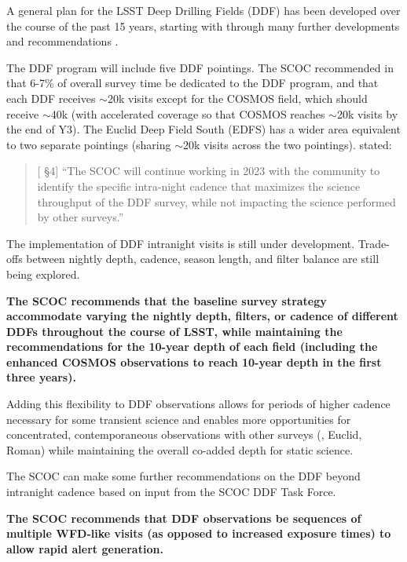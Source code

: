 A general plan for the LSST Deep Drilling Fields (DDF) has been developed over the course of the past 15 years, starting with \cite{2009arXiv0912.0201L} through many further developments and recommendations \citep[\eg ,][]{Brandt:2018,Scolnic:2018,Yu:2020,Kovacevic:2022,Czerny:2023,Zhang:2023,Gris:2023,Gris:2024,PozoNunez:2024}.

The DDF program will include
five DDF pointings. The SCOC recommended in  that  
6-7\% of overall survey time be dedicated to the DDF program, and that each DDF receives \mbox{$\sim$20k} visits
except for the COSMOS field, which should receive \mbox{$\sim$40k} (with accelerated coverage so that COSMOS reaches \mbox{$\sim$20k} visits by the end of Y3). The Euclid Deep Field South (EDFS) has a wider area equivalent to two separate pointings (sharing \mbox{$\sim$20k} visits across the two pointings).  stated: 
\begin{quote}
    {[ \S4] ``The SCOC will continue working in 2023 with the community to identify the specific intra-night cadence that maximizes the science throughput of the DDF survey, while not impacting the science performed by other surveys.''}
\end{quote}


The implementation of DDF intranight visits is still under development. Trade-offs between nightly depth, cadence, season length, and filter balance are still being explored.

{\bf The SCOC recommends that the baseline survey strategy accommodate varying the nightly depth, filters, or cadence of different DDFs throughout the course of LSST, while maintaining the  recommendations for the 10-year depth of each field (including the enhanced COSMOS observations to reach 10-year depth in the first three years).}

Adding this flexibility to DDF observations allows for periods of higher cadence necessary for some transient science \citep[\eg, AGN or supernovae;][]{Yu:2020,Kovacevic:2022,Czerny:2023,PozoNunez:2024,Gris:2023,Gris:2024} and enables more opportunities for concentrated, contemporaneous observations with other surveys (\eg , Euclid, Roman) while maintaining the overall co-added depth for static science.

The SCOC can make some further recommendations on the DDF beyond intranight cadence based on input from the SCOC DDF Task Force.

{\bf The SCOC recommends that DDF observations be sequences of multiple WFD-like visits (as opposed to increased exposure times) to allow rapid alert generation.} 

